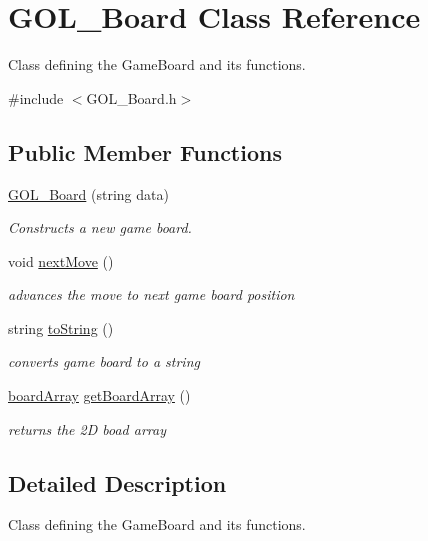 \hypertarget{class_g_o_l___board}{}\section{G\+O\+L\+\_\+\+Board Class Reference}
\label{class_g_o_l___board}


Class defining the Game\+Board and its functions.  




{\ttfamily \#include $<$G\+O\+L\+\_\+\+Board.\+h$>$}

\subsection*{Public Member Functions}
\begin{DoxyCompactItemize}
\item 
\hyperlink{class_g_o_l___board_a3a9d866e9d8904ce39324f26f084eac4}{G\+O\+L\+\_\+\+Board} (string data)
\begin{DoxyCompactList}\small\item\em Constructs a new game board. \end{DoxyCompactList}\item 
void \hyperlink{class_g_o_l___board_a0d555031e589a326adb485289a0a8a68}{next\+Move} ()
\begin{DoxyCompactList}\small\item\em advances the move to next game board position \end{DoxyCompactList}\item 
string \hyperlink{class_g_o_l___board_a9ef0e2f7c255f0bb486c8a31e392f284}{to\+String} ()
\begin{DoxyCompactList}\small\item\em converts game board to a string \end{DoxyCompactList}\item 
\hyperlink{_g_o_l___board_8h_aa8eecda883d639cd0032a7263411964f}{board\+Array} \hyperlink{class_g_o_l___board_a958a4c2dfe07b3d88d003afb72b9435a}{get\+Board\+Array} ()
\begin{DoxyCompactList}\small\item\em returns the 2D boad array \end{DoxyCompactList}\end{DoxyCompactItemize}


\subsection{Detailed Description}
Class defining the Game\+Board and its functions. 

